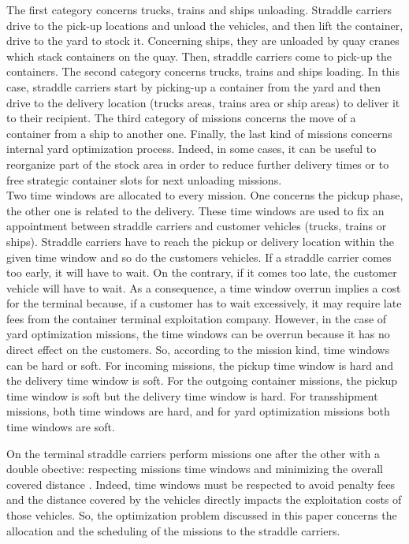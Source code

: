 \documentclass[a4paper,10pt]{article}
\begin{document}
The first category concerns trucks, trains and ships unloading. Straddle carriers drive to the pick-up locations and unload the vehicles, and then lift the container, drive to the yard to stock it. Concerning ships, they are unloaded by quay cranes which stack containers on the quay. Then, straddle carriers come to pick-up the containers.
The second category concerns trucks, trains and ships loading. In this case, straddle carriers start by picking-up a container from the yard and then drive to the delivery location (trucks areas, trains area or ship areas) to deliver it to their recipient. 
The third category of missions concerns the move of a container from a ship to another one.
Finally, the last kind of missions concerns internal yard optimization process. Indeed, in some cases, it can be useful to reorganize part of the stock area in order to reduce further delivery times or to free strategic container slots for next unloading missions.\\

Two time windows are allocated to every mission. One concerns the pickup phase, the other one is related to the delivery. These time windows are used to fix an appointment between straddle carriers and customer vehicles (trucks, trains or ships). Straddle carriers have to reach the pickup or delivery location within the given time window and so do the customers vehicles. If a straddle carrier comes too early, it will have to wait. On the contrary, if it comes too late, the customer vehicle will have to wait. As a consequence, a time window overrun implies a cost for the terminal because, if a customer has to wait excessively, it may require late fees from the container terminal exploitation company. However, in the case of yard optimization missions, the time windows can be overrun because it has no direct effect on the customers. So, according to the mission kind, time windows can be hard or soft. For incoming missions, the pickup time window is hard and the delivery time window is soft. For the outgoing container missions, the pickup time window is soft but the delivery time window is hard. For transshipment missions, both time windows are hard, and for yard optimization missions both time windows are soft. 

On the terminal straddle carriers perform missions one after the other with a double obective: respecting missions time windows and minimizing the overall covered distance \cite{Lesauvage2009}. Indeed, time windows must be respected to avoid penalty fees and the distance covered by the vehicles directly impacts the exploitation costs of those vehicles. %
So, the optimization problem discussed in this paper concerns the allocation and the scheduling of the missions to the straddle carriers.\\
\end{document}
